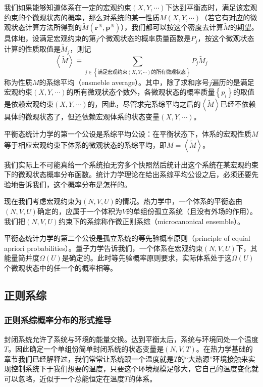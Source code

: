 \documentclass[main.tex]{subfiles}
\begin{document}
我们如果能够知道体系在一定的宏观约束$\left(X,Y,\cdots\right)$下达到平衡态时，满足该宏观约束的个微观状态的概率，那么对系统的某一性质$M\left(X,Y,\cdots\right)$（若它有对应的微观状态计算方法所得到的$\tilde{M}\left(\mathbf{r}^N,\mathbf{p}^N\right)$），我们都可以按这个密度去计算$\tilde{M}$的期望。具体地，设满足宏观约束的第$j$个微观状态的概率质量函数是$P_j$，按这个微观状态计算的性质取值是$\tilde{M}_j$，则记
\[
    \left\langle\tilde{M}\right\rangle\equiv\sum_{j\in\left\{\text{满足宏观约束$\left(X,Y,\cdots\right)$的所有微观状态}\right\}}P_j\tilde{M}_j
\]
称为性质$M$的系综平均（ensmeble average）。其中，除了求和序号$j$遍历的是满足宏观约束$\left(X,Y,\cdots\right)$的所有微观状态个数外，各微观状态的概率质量$\left\{p_i\right\}$的取值是依赖宏观约束$\left(X,Y,\cdots\right)$的，因此，尽管求完系综平均之后的$\left\langle\tilde{M}\right\rangle$已经不依赖具体的微观状态了，但还依赖宏观体系的状态变量$\left(X,Y,\cdots\right)$。

平衡态统计力学的第一个公设是系综平均公设：在平衡状态下，体系的宏观性质$M$等于相应宏观约束下体系的微观状态的系综平均，即$M=\left\langle\tilde{M}\right\rangle$。

我们实际上不可能真给一个系统拍无穷多个快照然后统计出这个系统在某宏观约束下的微观状态概率分布函数。统计力学理论在给出系综平均公设之后，必须还要先验地告诉我们，这个概率分布是怎样的。

现在我们考虑宏观约束为$\left(N,V,U\right)$的情况。热力学中，一个体系的平衡态由$\left(N,V,U\right)$确定的，应属于一个体积为$V$的单组份孤立系统（且没有外场的作用）。我们把$\left(N,V,U\right)$约束下的系综称作微正则系综（microcanonical ensemble）。

平衡态统计力学的第二个公设是孤立系统的等先验概率原则（principle of equial apriori probabilities）。量子力学告诉我们，一个体系在宏观约束$\left(N,V,U\right)$下，其能量简并度$\Omega\left(U\right)$是确定的。此时等先验概率原则要求，实际体系处于这$\Omega\left(U\right)$个微观状态中的任一个的概率相等。

\subsection{正则系综}
\subsubsection{正则系综概率分布的形式推导}
封闭系统允许了系统与环境的能量交换。达到平衡太后，系统与环境同处一个温度$T$。因此确定一个单组份简单封闭系统的状态变量是$\left(N,V,T\right)$。在热力学基础的章节我们已经解释过，我们常常让系统跟一个温度就是$T$的“大热源”环境接触来实现控制系统下于我们想要的温度，只要这个环境规模足够大，它自己的温度变化就可以忽略，近似于一个总能恒定在温度$T$的体系。
\end{document}
